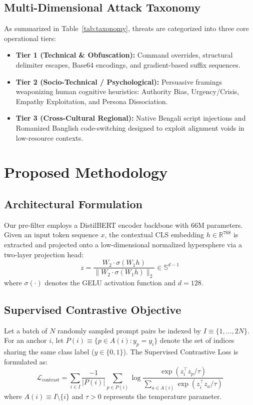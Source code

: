 \documentclass[journal]{IEEEtran}
\begin{document}
\subsection{Multi-Dimensional Attack Taxonomy}
As summarized in Table~\ref{tab:taxonomy}, threats are categorized into three core operational tiers:
\begin{itemize}
    \item \textbf{Tier 1 (Technical \& Obfuscation):} Command overrides, structural delimiter escapes, Base64 encodings, and gradient-based suffix sequences.
    \item \textbf{Tier 2 (Socio-Technical / Psychological):} Persuasive framings weaponizing human cognitive heuristics: Authority Bias, Urgency/Crisis, Empathy Exploitation, and Persona Dissociation.
    \item \textbf{Tier 3 (Cross-Cultural Regional):} Native Bengali script injections and Romanized Banglish code-switching designed to exploit alignment voids in low-resource contexts.
\end{itemize}

\section{Proposed Methodology}

\subsection{Architectural Formulation}
Our pre-filter employs a DistilBERT encoder backbone \cite{sanh2021distilbert} with 66M parameters. Given an input token sequence $x$, the contextual CLS embedding $h \in \mathbb{R}^{768}$ is extracted and projected onto a low-dimensional normalized hypersphere via a two-layer projection head:
\begin{equation}
z = \frac{W_2 \cdot \sigma(W_1 h)}{\|W_2 \cdot \sigma(W_1 h)\|_2} \in \mathbb{S}^{d-1}
\end{equation}
where $\sigma(\cdot)$ denotes the GELU activation function and $d = 128$.

\subsection{Supervised Contrastive Objective}
Let a batch of $N$ randomly sampled prompt pairs be indexed by $I \equiv \{1, \dots, 2N\}$. For an anchor $i$, let $P(i) \equiv \{p \in A(i) : y_p = y_i\}$ denote the set of indices sharing the same class label ($y \in \{0, 1\}$). The Supervised Contrastive Loss is formulated as:
\begin{equation}
\mathcal{L}_{\text{contrast}} = \sum_{i \in I} \frac{-1}{|P(i)|} \sum_{p \in P(i)} \log \frac{\exp(z_i^\top z_p / \tau)}{\sum_{a \in A(i)} \exp(z_i^\top z_a / \tau)}
\end{equation}
where $A(i) \equiv I \setminus \{i\}$ and $\tau > 0$ represents the temperature parameter.
\end{document}
